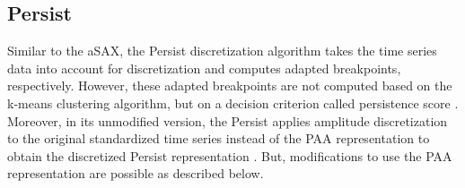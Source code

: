\subsection{Persist} \label{persist_modifications}
Similar to the \ac{aSAX}, the Persist discretization algorithm takes the time series data into account for discretization and computes adapted breakpoints, respectively. However, these adapted breakpoints are not computed based on the k-means clustering algorithm, but on a decision criterion called persistence score \cite{Persist}. \newline
Moreover, in its unmodified version, the Persist applies amplitude discretization to the original standardized time series instead of the \ac{PAA} representation to obtain the discretized Persist representation \cite{Persist}. But, modifications to use the \ac{PAA} representation are possible as described below.
